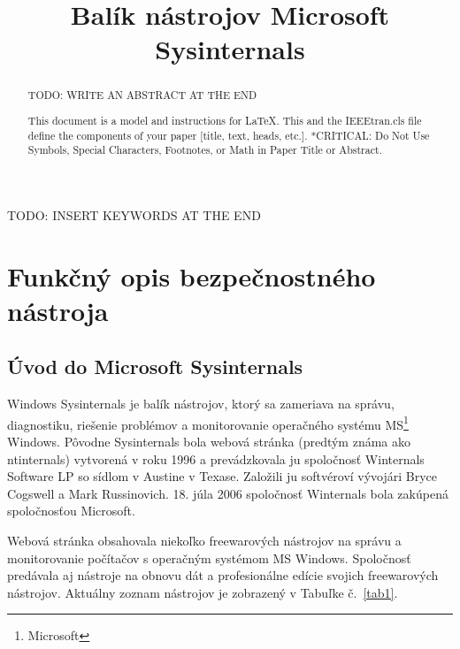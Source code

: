 \documentclass[conference]{IEEEtran}
\begin{document}
\title{Balík nástrojov Microsoft Sysinternals}

\author{
}

\maketitle

\begin{abstract}
TODO: WRITE AN ABSTRACT AT THE END

This document is a model and instructions for \LaTeX.
This and the IEEEtran.cls file define the components of your paper [title, text, heads, etc.]. *CRITICAL: Do Not Use Symbols, Special Characters, Footnotes, 
or Math in Paper Title or Abstract.
\end{abstract}

\begin{IEEEkeywords}
TODO: INSERT KEYWORDS AT THE END
\end{IEEEkeywords}



\section{Funkčný opis bezpečnostného nástroja}
\subsection{Úvod do Microsoft Sysinternals}

Windows Sysinternals je balík nástrojov, ktorý sa zameriava na správu, diagnostiku, riešenie problémov a monitorovanie operačného systému MS\footnote{Microsoft} Windows. Pôvodne Sysinternals bola webová stránka (predtým známa ako ntinternals) vytvorená v roku 1996 a prevádzkovala ju spoločnosť Winternals Software LP so sídlom v Austine v Texase. Založili ju softvéroví vývojári Bryce Cogswell a Mark Russinovich. 18. júla 2006 spoločnosť Winternals bola zakúpená spoločnosťou Microsoft.

Webová stránka obsahovala niekoľko freewarových nástrojov na správu a monitorovanie počítačov s operačným systémom MS Windows. Spoločnosť predávala aj nástroje na obnovu dát a profesionálne edície svojich freewarových nástrojov.\cite{enwiki:1248667707}
Aktuálny zoznam nástrojov\cite{microsoft-sysinternals} je zobrazený v Tabuľke č.~\ref{tab1}.
\end{document}
